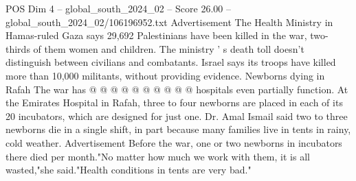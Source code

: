 \begin{textsample}{POS Dim 4 – global\_south\_2024\_02 – Score 26.00 – global\_south\_2024\_02/106196952.txt}
Advertisement The Health Ministry in Hamas-ruled Gaza says 29,692 Palestinians have been killed in the war, two-thirds of them women and children.
The ministry ' s death toll doesn't distinguish between civilians and combatants.
Israel says its troops have killed more than 10,000 militants, without providing evidence.
Newborns dying in Rafah The war has @ @ @ @ @ @ @ @ @ @ hospitals even partially function.
At the Emirates Hospital in Rafah, three to four newborns are placed in each of its 20 incubators, which are designed for just one.
Dr.
Amal Ismail said two to three newborns die in a single shift, in part because many families live in tents in rainy, cold weather.
Advertisement Before the war, one or two newborns in incubators there died per month."No matter how much we work with them, it is all wasted,"she said."Health conditions in tents are very bad."

\end{textsample}
